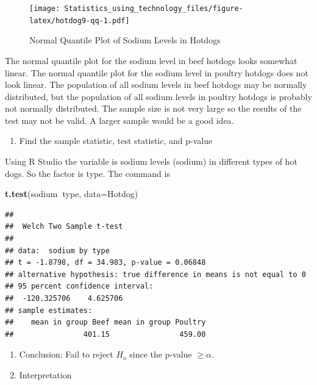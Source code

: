 \documentclass[
]{book}
\newenvironment{Shaded}{\begin{snugshade}}{\end{snugshade}}
\newcommand{\DataTypeTok}[1]{\textcolor[rgb]{0.13,0.29,0.53}{#1}}
\newcommand{\KeywordTok}[1]{\textcolor[rgb]{0.13,0.29,0.53}{\textbf{#1}}}
\newcommand{\NormalTok}[1]{#1}
\newcommand{\OperatorTok}[1]{\textcolor[rgb]{0.81,0.36,0.00}{\textbf{#1}}}
\providecommand{\tightlist}{%
  \setlength{\itemsep}{0pt}\setlength{\parskip}{0pt}}
\begin{document}
\begin{figure}
\centering
\texttt{[image: Statistics\_using\_technology\_files/figure-latex/hotdog9-qq-1.pdf]}
\caption{\label{fig:hotdog9-qq}Normal Quantile Plot of Sodium Levels in Hotdogs}
\end{figure}

The normal quantile plot for the sodium level in beef hotdogs looks somewhat linear. The normal quantile plot for the sodium level in poultry hotdogs does not look linear. The population of all sodium levels in beef hotdogs may be normally distributed, but the population of all sodium levels in poultry hotdogs is probably not normally distributed. The sample size is not very large so the results of the test may not be valid. A larger sample would be a good idea.

\begin{enumerate}
\def\labelenumi{\arabic{enumi}.}
\setcounter{enumi}{3}
\tightlist
\item
  Find the sample statistic, test statistic, and p-value
\end{enumerate}

Using R Studio the variable is sodium levels (sodium) in different types of hot dogs. So the factor is type. The command is

\begin{Shaded}
\begin{Highlighting}[]
\KeywordTok{t.test}\NormalTok{(sodium}\OperatorTok{~}\NormalTok{type, }\DataTypeTok{data=}\NormalTok{Hotdog)}
\end{Highlighting}
\end{Shaded}

\begin{verbatim}
## 
## 	Welch Two Sample t-test
## 
## data:  sodium by type
## t = -1.8798, df = 34.983, p-value = 0.06848
## alternative hypothesis: true difference in means is not equal to 0
## 95 percent confidence interval:
##  -120.325706    4.625706
## sample estimates:
##    mean in group Beef mean in group Poultry 
##                401.15                459.00
\end{verbatim}

\begin{enumerate}
\def\labelenumi{\arabic{enumi}.}
\setcounter{enumi}{4}
\item
  Conclusion: Fail to reject \(H_o\) since the p-value \(\ge \alpha\).
\item
  Interpretation
\end{enumerate}
\end{document}
